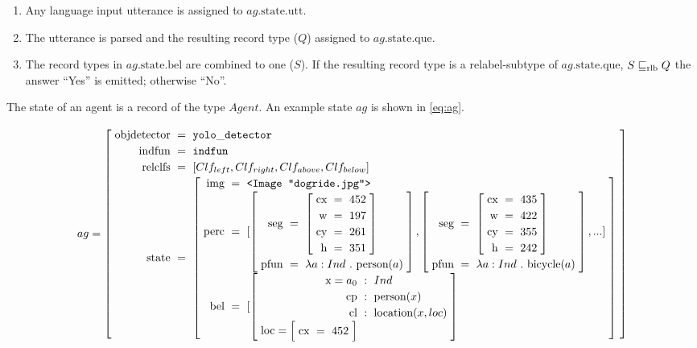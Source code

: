 \begin{enumerate}
\item Any language input utterance is assigned to $ag.\text{state.utt}$.
\item The utterance is parsed and the resulting record type ($Q$) assigned to $ag.\text{state.que}$.
\item The record types in $ag.\text{state.bel}$ are combined to one ($S$). If the resulting record type is a relabel-subtype of $ag.\text{state.que}$, $S \mathrel{\sqsubseteq_\text{rlb}} Q$ the answer ``Yes'' is emitted; otherwise ``No''.
\end{enumerate}

The state of an agent is a record of the type $Agent$.
An example state $ag$ is shown in \autoref{eq:ag}.

\begin{landscape}
\begin{equation}\label{eq:ag}
\def\arraystretch{1.2}
ag =
\rec{
    \text{objdetector} &=& \mathtt{yolo\_detector} \\
    \text{indfun} &=& \mathtt{indfun} \\
    \text{relclfs} &=& [Clf_{left}, Clf_{right}, Clf_{above}, Clf_{below}] \\
    \text{state} &=& \rec{
		\text{img} &=& \text{\tt <Image "dogride.jpg">} \\
		\text{perc} &=& [
			\rec{
				\text{seg} &=& \rec{
					\text{cx} &=& 452\\
					\text{w} &=& 197\\
					\text{cy} &=& 261 \\
					\text{h} &=& 351\\
					}\\
				\text{pfun} &=& \lambda a:Ind\ .\ \text{person}(a)
				},
			\rec{
				\text{seg} &=& \rec{
					\text{cx} &=& 435\\
					\text{w} &=& 422\\
					\text{cy} &=& 355 \\
					\text{h} &=& 242\\
					}\\
				\text{pfun} &=& \lambda a:Ind\ .\ \text{bicycle}(a)
				},
			... ] \\
		\text{bel} &=& [
			\rec{
				\text{x} = a_0 &:& Ind\\
				\text{cp} &:& \text{person}(x)\\
				\text{cl} &:& \text{location}(x, loc)\\
				\text{loc} = \rec{
					\text{cx} &=& 452\\
}}}}
\end{equation}
\end{landscape}
